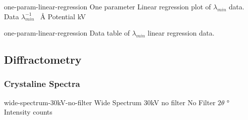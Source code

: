 \documentclass{WitsPhysicsReport}
\begin{document}
\lipsum[14]

                                 {one-param-linear-regression} %
                                 {One parameter Linear regression plot of $\lambda_{min}$ data.} %
                                 {Data} %
                                 {$\lambda^{-1}_{min}$} %
                                 {\si{\per\angstrom}} %
                                 {Potential} %
                                 {\si{\kilo\volt}} %

\lipsum[15]

                       {one-param-linear-regression} %
                       {Data table of $ \lambda_{min} $ linear regression data.} %

\lipsum[16]

\subsection{Diffractometry}
\label{subsec:Diffractometry}

\lipsum[17]

\lipsum[18]

\subsubsection{Crystaline Spectra}
\label{subsubsec:Crystaline_Spectra}

\lipsum[19]

                     {wide-spectrum-30kV-no-filter} %
                     {Wide Spectrum 30kV no filter} %
                     {No Filter} %
                     {$2 \theta$} %
                     {\si{\degree}} %
                     {Intensity} %
                     {counts} %
                     {%
                     }
\end{document}
